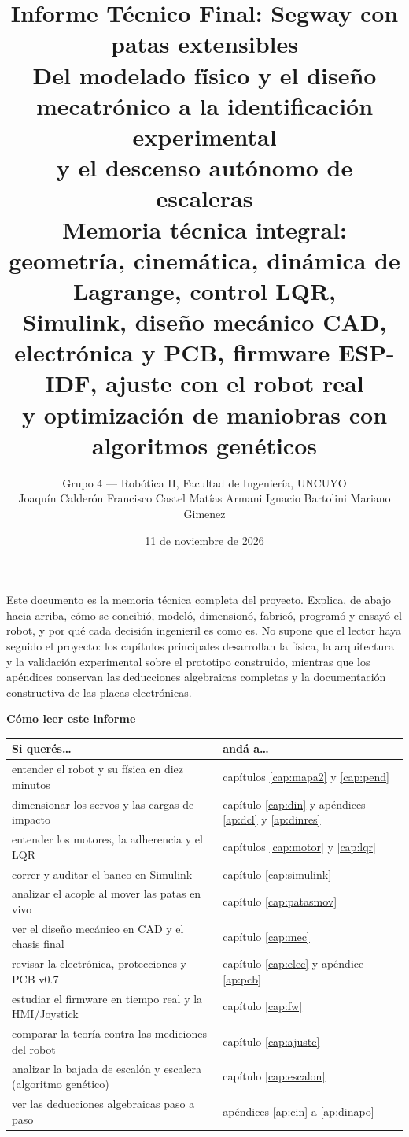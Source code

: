 \documentclass[11pt,a4paper]{report}
\title{\vspace{-1.5cm}\Huge Informe Técnico Final: Segway con patas extensibles\\[10pt]
\large Del modelado físico y el diseño mecatrónico a la identificación experimental\\
y el descenso autónomo de escaleras\\[18pt]
\normalsize Memoria técnica integral: geometría, cinemática, dinámica de Lagrange, control LQR,\\
Simulink, diseño mecánico CAD, electrónica y PCB, firmware ESP-IDF, ajuste con el robot real\\
y optimización de maniobras con algoritmos genéticos}
\author{Grupo 4 --- Robótica II, Facultad de Ingeniería, UNCUYO\\[4pt]
\small Joaquín Calderón \quad\textbullet\quad Francisco Castel \quad\textbullet\quad Matías Armani \quad\textbullet\quad Ignacio Bartolini \quad\textbullet\quad Mariano Gimenez}
\date{11 de noviembre de 2026}
\begin{document}
\maketitle

\begin{idea}
Este documento es la memoria técnica completa del proyecto. Explica, de abajo hacia arriba,
cómo se concibió, modeló, dimensionó, fabricó, programó y ensayó el robot, y por qué cada
decisión ingenieril es como es. No supone que el lector haya seguido el proyecto: los
capítulos principales desarrollan la física, la arquitectura y la validación experimental
sobre el prototipo construido, mientras que los apéndices conservan las deducciones
algebraicas completas y la documentación constructiva de las placas electrónicas.
\end{idea}

\vspace{4pt}
{\large\bfseries Cómo leer este informe}

\begin{center}
\begin{tabular}{@{}p{5.2cm}p{9.5cm}@{}}
\toprule
\textbf{Si querés\ldots} & \textbf{andá a\ldots} \\
\midrule
entender el robot y su física en diez minutos & capítulos \ref{cap:mapa2} y \ref{cap:pend} \\
dimensionar los servos y las cargas de impacto & capítulo \ref{cap:din} y apéndices \ref{ap:dcl} y \ref{ap:dinres} \\
entender los motores, la adherencia y el LQR & capítulos \ref{cap:motor} y \ref{cap:lqr} \\
correr y auditar el banco en Simulink & capítulo \ref{cap:simulink} \\
analizar el acople al mover las patas en vivo & capítulo \ref{cap:patasmov} \\
ver el diseño mecánico en CAD y el chasis final & capítulo \ref{cap:mec} \\
revisar la electrónica, protecciones y PCB v0.7 & capítulo \ref{cap:elec} y apéndice \ref{ap:pcb} \\
estudiar el firmware en tiempo real y la HMI/Joystick & capítulo \ref{cap:fw} \\
comparar la teoría contra las mediciones del robot & capítulo \ref{cap:ajuste} \\
analizar la bajada de escalón y escalera (algoritmo genético) & capítulo \ref{cap:escalon} \\
ver las deducciones algebraicas paso a paso & apéndices \ref{ap:cin} a \ref{ap:dinapo} \\
\bottomrule
\end{tabular}
\end{center}
\end{document}
